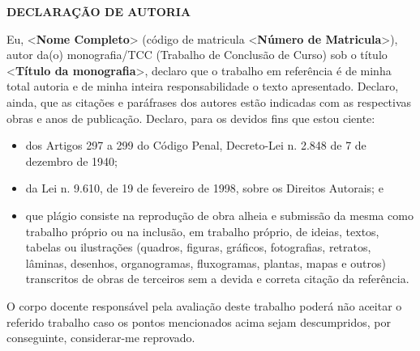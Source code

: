 \documentclass[
	12pt,				%
	openright,			%
	oneside,	
	a4paper,				%
	english,				%
	brazil				%
]{abntex2/abntex2} %
\begin{document}
%
% 
%
\begin{folhadedeclaracaoautoria}
	\parindent=0pt
	\setlength{\ABNTEXsignskip}{1.5cm}
	
	\begin{center}
		\fontsize{12}{15}\selectfont
		\vspace*{0.5cm}
		\textbf{DECLARAÇÃO DE AUTORIA}
		\vspace*{1cm}
	\end{center}
	

	Eu, <\textbf{Nome Completo}> (código de matricula <\textbf{Número de Matricula}>), autor da(o) monografia/TCC (Trabalho de Conclusão de Curso) sob o título <\textbf{Título da monografia}>, declaro que o trabalho em referência é de minha total autoria e de minha inteira responsabilidade o texto apresentado. Declaro, ainda, que as citações e paráfrases dos  autores estão indicadas com as respectivas obras e anos de publicação. Declaro, para os devidos fins que estou ciente:
    \begin{itemize}\setlength\itemsep{.02em}
        \item  dos Artigos 297 a 299 do Código Penal, Decreto-Lei n. 2.848 de 7 de dezembro de 1940;
        \item  da Lei n. 9.610, de 19 de fevereiro de 1998, sobre os Direitos Autorais; e
        \item  que plágio consiste na reprodução de obra alheia e submissão da mesma como trabalho próprio ou na inclusão, em trabalho próprio, de ideias, textos, tabelas ou ilustrações (quadros, figuras, gráficos, fotografias, retratos, lâminas, desenhos, organogramas, fluxogramas, plantas, mapas e outros) transcritos de obras de terceiros sem a devida e correta citação da referência.
    \end{itemize}
    
    O corpo docente responsável pela avaliação deste trabalho poderá  não  aceitar o referido trabalho caso os pontos mencionados acima sejam descumpridos, por conseguinte, considerar-me reprovado.

	\vspace{1cm}
	
	\vfill
	
	\BgThispage
  
\end{folhadedeclaracaoautoria}
\end{document}
